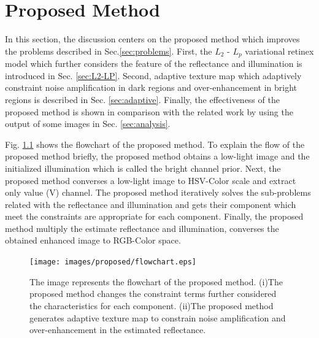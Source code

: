 \chapter{Proposed Method}
\label{sec:proposed}
In this section, the discussion centers on the proposed method which improves the problems described in Sec.\ref{sec:problems}.
First, the $L_{2}$ - $L_{p}$ variational retinex model which further considers the feature of the reflectance and illumination is introduced in Sec. \ref{sec:L2-LP}. 
Second, adaptive texture map which adaptively constraint noise amplification in dark regions and over-enhancement in bright regions is described in Sec. \ref{sec:adaptive}. 
Finally, the effectiveness of the proposed method is shown in comparison with the related work by using the output of some images in Sec. \ref{sec:analysis}.\par
Fig. \ref{fig:proposed/flowchart} shows the flowchart of the proposed method.
To explain the flow of the proposed method briefly, the proposed method obtains a low-light image and the initialized illumination which is called the bright channel prior. Next, the proposed method converses a low-light image to HSV-Color scale and extract only value (V) channel. The proposed method iteratively solves the sub-problems related with the reflectance and illumination and gets their component which meet the constraints are appropriate for each component. Finally, the proposed method multiply the estimate reflectance and illumination, converses the obtained enhanced image to RGB-Color space.

\begin{figure}[htbp]
	\centering
	\texttt{[image: images/proposed/flowchart.eps]}
	\caption{The image represents the flowchart of the proposed method. (i)The proposed method changes the constraint terms further considered the characteristics for each component. (ii)The proposed method generates adaptive texture map to constrain noise  amplification and over-enhancement in the estimated reflectance. } \label{fig:proposed/flowchart}
\end{figure}


